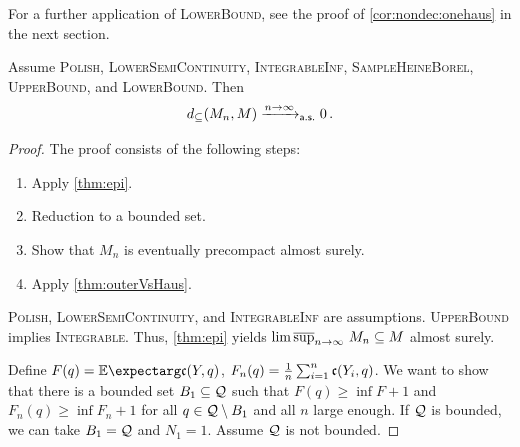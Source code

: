 \begin{remark}
\begin{itemize}
	For a further application of \textsc{LowerBound}, see the proof of \autoref{cor:nondec:onehaus} in the next section.
\end{itemize}
\end{remark}
%
\begin{theorem}\label{thm:consistency}
	Assume \textsc{Polish}, \textsc{LowerSemiContinuity}, \textsc{IntegrableInf},  \textsc{SampleHeineBorel}, \textsc{UpperBound}, and \textsc{LowerBound}. Then
	\begin{equation*}
		d_\subseteq(M_n, M) \xrightarrow{n\to\infty}_{\mathsf{a.s.}} 0
		\, .
	\end{equation*}
\end{theorem}
%
\begin{proof}
The proof consists of the following steps:
\begin{enumerate}
\item Apply \autoref{thm:epi}.
\item Reduction to a bounded set.
\item Show that $M_n$ is eventually precompact almost surely.
\item Apply \autoref{thm:outerVsHaus}.
\end{enumerate}
%
\noindent
\underline{}
\textsc{Polish}, \textsc{LowerSemiContinuity}, and \textsc{IntegrableInf} are assumptions. \textsc{UpperBound} implies \textsc{Integrable}. Thus, \autoref{thm:epi} yields $\operatorname*{lim\, \overline{sup}}_{n\to\infty}\, M_n \subseteq M$ almost surely.

\noindent
\underline{}
Define $F(q) = \Ex{\mf c(Y, q)}$, $F_n(q) = \frac1n\sum_{i=1}^n \mathfrak{c}(Y_i, q)$.
We want to show that there is a bounded set $B_1 \subseteq \mathcal{Q}$ such that $F(q) \geq \inf F + 1$ and $F_n(q) \geq \inf F_n + 1$ for all $q\in \mathcal{Q} \setminus B_1$ and all $n$ large enough. If $\mathcal{Q}$ is bounded, we can take $B_1 = \mathcal{Q}$ and $N_1 = 1$. Assume $\mathcal{Q}$ is not bounded.


\end{proof}
